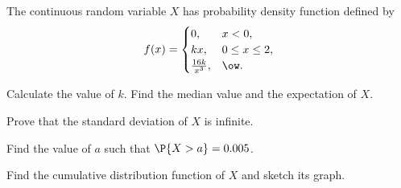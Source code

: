 \begin{problem}
    The continuous random variable $X$ has probability density function defined by \[f(x) = \begin{cases}
        0, & x < 0,\\
        kx, & 0 \leq x \leq 2,\\
        \frac{16k}{x^3}, & \ow.
    \end{cases}\]

    Calculate the value of $k$. Find the median value and the expectation of $X$.
    
    Prove that the standard deviation of $X$ is infinite.
    
    Find the value of $a$ such that $\P{X>a}=0.005$.
    
    Find the cumulative distribution function of $X$ and sketch its graph.
\end{problem}
